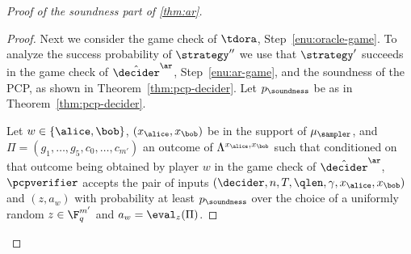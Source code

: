 \begin{proof}[Proof of the soundness part of \cref{thm:ar}]
\begin{proof}
  Next we consider the game check of $\tdora$,
  Step~\ref{enu:oracle-game}.
  To analyze the success probability of $\strategy''$ we use that $\strategy'$
  succeeds in the game check of $\tdans$, Step~\ref{enu:ar-game}, and the
  soundness of the PCP, as shown in Theorem~\ref{thm:pcp-decider}.
  Let $p_{\soundness}$ be as in Theorem~\ref{thm:pcp-decider}.

  Let $w\in\{\alice,\bob\}$, $(x_\alice,x_\bob)$ be in the support of
  $\mu_\sampler$, and $\Pi = (g_1,\ldots,g_5,c_0,\ldots,c_{m'})$ an outcome of
  $\Lambda^{x_\alice,x_\bob}$ such that conditioned on that outcome being
  obtained by player $w$ in the game check of $\tdans$, $\pcpverifier$
  accepts the pair of inputs $(\decider, n , T, \qlen, \gamma, x_{\alice}, x_{\bob})$
  and $(z, a_{w} )$ with probability at least $p_{\soundness}$ over the choice of
  a uniformly random $z\in \F_q^{m'}$ and $a_w = \eval_z(\Pi)$.
			

\end{proof}
\end{proof}
